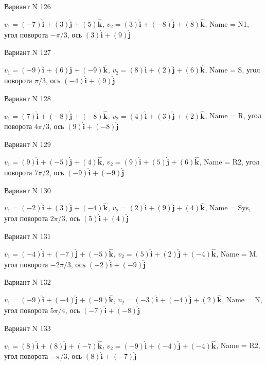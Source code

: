 \documentclass[11pt]{report}
\begin{document}
Вариант N 126

$v_1 = (-7)\mathbf{\hat{i}_{}} + (3)\mathbf{\hat{j}_{}} + (5)\mathbf{\hat{k}_{}}$, $v_2 = (3)\mathbf{\hat{i}_{}} + (-8)\mathbf{\hat{j}_{}} + (8)\mathbf{\hat{k}_{}}$, Name = N1, угол поворота $- \pi / 3$, ось $(3)\mathbf{\hat{i}_{}} + (9)\mathbf{\hat{j}_{}}$

Вариант N 127

$v_1 = (-9)\mathbf{\hat{i}_{}} + (6)\mathbf{\hat{j}_{}} + (-9)\mathbf{\hat{k}_{}}$, $v_2 = (8)\mathbf{\hat{i}_{}} + (2)\mathbf{\hat{j}_{}} + (6)\mathbf{\hat{k}_{}}$, Name = S, угол поворота $\pi / 3$, ось $(-4)\mathbf{\hat{i}_{}} + (9)\mathbf{\hat{j}_{}}$

Вариант N 128

$v_1 = (7)\mathbf{\hat{i}_{}} + (-8)\mathbf{\hat{j}_{}} + (-8)\mathbf{\hat{k}_{}}$, $v_2 = (4)\mathbf{\hat{i}_{}} + (3)\mathbf{\hat{j}_{}} + (2)\mathbf{\hat{k}_{}}$, Name = R, угол поворота $4 \pi / 3$, ось $(9)\mathbf{\hat{i}_{}} + (-8)\mathbf{\hat{j}_{}}$

Вариант N 129

$v_1 = (9)\mathbf{\hat{i}_{}} + (-5)\mathbf{\hat{j}_{}} + (4)\mathbf{\hat{k}_{}}$, $v_2 = (9)\mathbf{\hat{i}_{}} + (5)\mathbf{\hat{j}_{}} + (6)\mathbf{\hat{k}_{}}$, Name = R2, угол поворота $7 \pi / 2$, ось $(-9)\mathbf{\hat{i}_{}} + (-9)\mathbf{\hat{j}_{}}$

Вариант N 130

$v_1 = (-2)\mathbf{\hat{i}_{}} + (3)\mathbf{\hat{j}_{}} + (-4)\mathbf{\hat{k}_{}}$, $v_2 = (2)\mathbf{\hat{i}_{}} + (9)\mathbf{\hat{j}_{}} + (4)\mathbf{\hat{k}_{}}$, Name = Sys, угол поворота $2 \pi / 3$, ось $(5)\mathbf{\hat{i}_{}} + (4)\mathbf{\hat{j}_{}}$

Вариант N 131

$v_1 = (-4)\mathbf{\hat{i}_{}} + (-7)\mathbf{\hat{j}_{}} + (-5)\mathbf{\hat{k}_{}}$, $v_2 = (5)\mathbf{\hat{i}_{}} + (2)\mathbf{\hat{j}_{}} + (-4)\mathbf{\hat{k}_{}}$, Name = M, угол поворота $- 2 \pi / 3$, ось $(-2)\mathbf{\hat{i}_{}} + (-9)\mathbf{\hat{j}_{}}$

Вариант N 132

$v_1 = (-9)\mathbf{\hat{i}_{}} + (-4)\mathbf{\hat{j}_{}} + (-9)\mathbf{\hat{k}_{}}$, $v_2 = (-3)\mathbf{\hat{i}_{}} + (-4)\mathbf{\hat{j}_{}} + (2)\mathbf{\hat{k}_{}}$, Name = N, угол поворота $5 \pi / 4$, ось $(-7)\mathbf{\hat{i}_{}} + (-8)\mathbf{\hat{j}_{}}$

Вариант N 133

$v_1 = (8)\mathbf{\hat{i}_{}} + (8)\mathbf{\hat{j}_{}} + (-7)\mathbf{\hat{k}_{}}$, $v_2 = (-9)\mathbf{\hat{i}_{}} + (-4)\mathbf{\hat{j}_{}} + (-4)\mathbf{\hat{k}_{}}$, Name = R2, угол поворота $- \pi / 3$, ось $(8)\mathbf{\hat{i}_{}} + (-7)\mathbf{\hat{j}_{}}$
\end{document}
